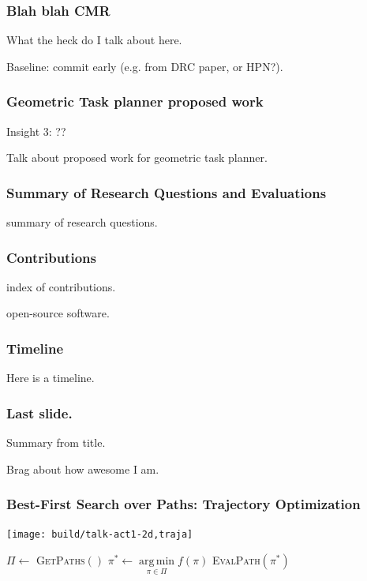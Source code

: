 \documentclass[serif]{beamer}
\DeclareMathOperator*{\argmin}{arg\,min}
\begin{document}
\begin{frame}
   \frametitle{Blah blah CMR}
   
   What the heck do I talk about here.
   
   Baseline: commit early (e.g. from DRC paper, or HPN?).
   
\end{frame}

\begin{frame}
   \frametitle{Geometric Task planner proposed work}
   
   Insight 3: ??
   
   Talk about proposed work for geometric task planner.
   
\end{frame}

\begin{frame}
   \frametitle{Summary of Research Questions and Evaluations}
   
   summary of research questions.
   
\end{frame}

\begin{frame}
   \frametitle{Contributions}
   
   index of contributions.
   
   open-source software.
   
\end{frame}

\begin{frame}
   \frametitle{Timeline}
   
   Here is a timeline.
   
\end{frame}

\begin{frame}
   \frametitle{Last slide.}
   
   Summary from title.
   
   Brag about how awesome I am.
   
\end{frame}

\begin{frame}
   \frametitle{Best-First Search over Paths: Trajectory Optimization}
   \begin{center}
      \texttt{[image: build/talk-act1-2d,traja]}
      
      \begin{minipage}{0.65\textwidth}
      \begin{algorithmic}
      \Loop
         \State $\Pi \leftarrow $ \textsc{GetPaths}$()$
            \Comment {}
         \State $\pi^* \leftarrow \argmin\limits_{\pi \in \Pi} f(\pi)$
            \Comment {}
         \State \textsc{EvalPath}$(\pi^*)$
            \Comment {}
      \EndLoop
      \end{algorithmic}
      \end{minipage}
   \end{center}
\end{frame}
\end{document}
